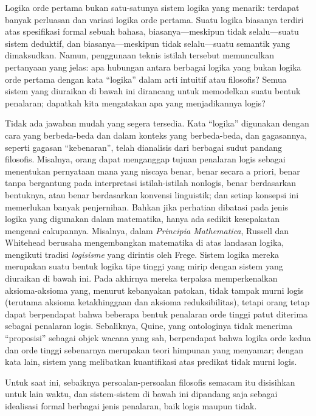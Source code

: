 \documentclass[../../../include/open-logic-section]{subfiles}
\begin{document}


Logika orde pertama bukan satu-satunya sistem logika yang menarik: terdapat
banyak perluasan dan variasi logika orde pertama. Suatu logika biasanya
terdiri atas spesifikasi formal sebuah bahasa, biasanya---meskipun tidak
selalu---suatu sistem deduktif, dan biasanya---meskipun tidak selalu---suatu
semantik yang dimaksudkan. Namun, penggunaan teknis istilah tersebut
memunculkan pertanyaan yang jelas: apa hubungan antara berbagai logika yang
bukan logika orde pertama dengan kata ``logika'' dalam arti intuitif atau
filosofis? Semua sistem yang diuraikan di bawah ini dirancang untuk memodelkan
suatu bentuk penalaran; dapatkah kita mengatakan apa yang menjadikannya logis?

Tidak ada jawaban mudah yang segera tersedia. Kata ``logika'' digunakan
dengan cara yang berbeda-beda dan dalam konteks yang berbeda-beda, dan
gagasannya, seperti gagasan ``kebenaran'', telah dianalisis dari berbagai
sudut pandang filosofis. Misalnya, orang dapat menganggap tujuan penalaran
logis sebagai menentukan pernyataan mana yang niscaya benar, benar secara
a priori, benar tanpa bergantung pada interpretasi istilah-istilah
nonlogis, benar berdasarkan bentuknya, atau benar berdasarkan konvensi
linguistik; dan setiap konsepsi ini memerlukan banyak penjernihan. Bahkan jika
perhatian dibatasi pada jenis logika yang digunakan dalam matematika, hanya
ada sedikit kesepakatan mengenai cakupannya. Misalnya, dalam
\textit{Principia Mathematica}, Russell dan Whitehead berusaha mengembangkan
matematika di atas landasan logika, mengikuti tradisi {\em logisisme} yang
dirintis oleh Frege. Sistem logika mereka merupakan suatu bentuk logika tipe
tinggi yang mirip dengan sistem yang diuraikan di bawah ini. Pada akhirnya
mereka terpaksa memperkenalkan aksioma-aksioma yang, menurut kebanyakan
patokan, tidak tampak murni logis (terutama aksioma ketakhinggaan dan aksioma
reduksibilitas), tetapi orang tetap dapat berpendapat bahwa beberapa bentuk
penalaran orde tinggi patut diterima sebagai penalaran logis. Sebaliknya,
Quine, yang ontologinya tidak menerima ``proposisi'' sebagai objek wacana yang
sah, berpendapat bahwa logika orde kedua dan orde tinggi sebenarnya merupakan
teori himpunan yang menyamar; dengan kata lain, sistem yang melibatkan
kuantifikasi atas predikat tidak murni logis.

Untuk saat ini, sebaiknya persoalan-persoalan filosofis semacam itu disisihkan
untuk lain waktu, dan sistem-sistem di bawah ini dipandang saja sebagai
idealisasi formal berbagai jenis penalaran, baik logis maupun tidak.
\end{document}
